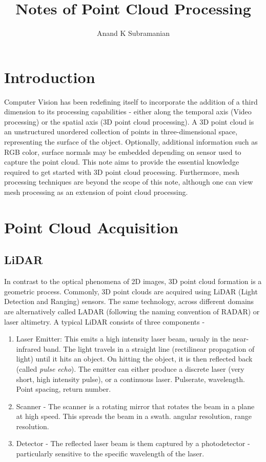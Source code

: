 \documentclass[a4paper, 11pt, twocolumn]{article}
\title{Notes of Point Cloud Processing}
\author{Anand K Subramanian}
\date{}
\begin{document}
\maketitle

\section{Introduction}

Computer Vision has been redefining itself to incorporate the addition of a third dimension to its processing capabilities - either along the temporal axis (Video processing) or the spatial axis (3D point cloud processing). A 3D point cloud is an unstructured unordered collection of points in three-dimensional space, representing the surface of the object. Optionally, additional information such as RGB color, surface normals may be embedded depending on sensor used to capture the point cloud. This note aims to provide the essential knowledge required to get started with 3D point cloud processing. Furthermore, mesh processing techniques are beyond the scope of this note, although one can view mesh processing as an extension of point cloud processing.


\section{Point Cloud Acquisition}
\subsection{LiDAR}
In contrast to the optical phenomena of 2D images, 3D point cloud formation is a geometric process. Commonly, 3D point clouds are acquired using LiDAR (Light Detection and Ranging) sensors. The same technology, across different domains are alternatively called LADAR (following the naming convention of RADAR) or laser altimetry. A typical LiDAR consists of three components -
\begin{enumerate}
    \item Laser Emitter: This emits a high intensity laser beam, usualy in the near-infrared band. The light travels in a straight line (rectilinear propagation of light) until it hits an object. On hitting the object, it is then reflected back (called \textit{pulse echo}). The emitter can either produce a discrete laser (very short, high intensity pulse), or a continuous laser.  Pulserate, wavelength. Point spacing, return number.
    \item Scanner - The scanner is a rotating mirror that rotates the beam in a plane at high speed. This spreads the beam in a swath. angular resolution, range resolution.
    \item Detector - The reflected laser beam is them captured by a photodetector - particularly sensitive to the specific wavelength of the laser.
\end{enumerate}
\end{document}
